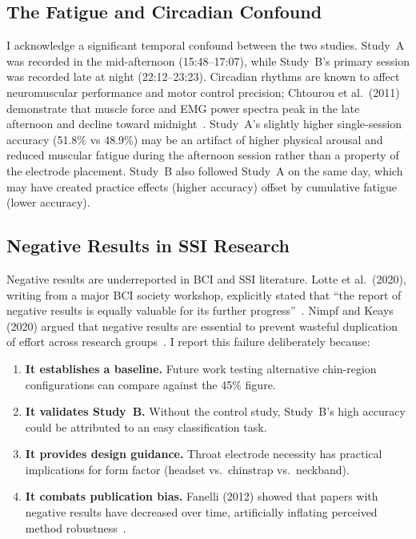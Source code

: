 \documentclass{article}
\begin{document}
\subsection{The Fatigue and Circadian Confound}

I acknowledge a significant temporal confound between the two studies. Study~A was recorded in the mid-afternoon (15:48--17:07), while Study~B's primary session was recorded late at night (22:12--23:23). Circadian rhythms are known to affect neuromuscular performance and motor control precision; Chtourou et al.\ (2011) demonstrate that muscle force and EMG power spectra peak in the late afternoon and decline toward midnight~\cite{chtourou2011}. Study~A's slightly higher single-session accuracy (51.8\% vs 48.9\%) may be an artifact of higher physical arousal and reduced muscular fatigue during the afternoon session rather than a property of the electrode placement. Study~B also followed Study~A on the same day, which may have created practice effects (higher accuracy) offset by cumulative fatigue (lower accuracy).

\subsection{Negative Results in SSI Research}

Negative results are underreported in BCI and SSI literature. Lotte et al.\ (2020), writing from a major BCI society workshop, explicitly stated that ``the report of negative results is equally valuable for its further progress''~\cite{lotte2020}. Nimpf and Keays (2020) argued that negative results are essential to prevent wasteful duplication of effort across research groups~\cite{fessenden2019}. I report this failure deliberately because:
\begin{enumerate}
    \item \textbf{It establishes a baseline.} Future work testing alternative chin-region configurations can compare against the 45\% figure.
    \item \textbf{It validates Study~B.} Without the control study, Study~B's high accuracy could be attributed to an easy classification task.
    \item \textbf{It provides design guidance.} Throat electrode necessity has practical implications for form factor (headset vs.\ chinstrap vs.\ neckband).
    \item \textbf{It combats publication bias.} Fanelli (2012) showed that papers with negative results have decreased over time, artificially inflating perceived method robustness~\cite{fanelli2012}.
\end{enumerate}
\end{document}
